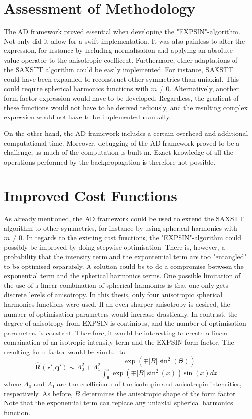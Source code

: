 \section{Assessment of Methodology}
\noindent
The AD framework proved essential when developing the "EXPSIN"-algorithm. Not only did it allow for a swift implementation.
It was also painless to alter the expression, for instance by including normalisation and applying an absolute value operator to the anisotropic coefficent.
Furthermore, other adaptations of the SAXSTT algorithm could be easily implemented. For instance, SAXSTT could have been expanded to reconstruct other symmetries than uniaxial.
This could require spherical harmonics functions with $m \neq 0$. Alternatively, another form factor expression would have to be developed.
Regardless, the gradient of these functions would not have to be derived tediously, and the resulting complex expression would not have to be implemented manually.

On the other hand, the AD framework includes a certain overhead and additional computational time. Moreover, debugging of the AD framework proved to be a challenge, as much of the computation is built-in.
Exact knowledge of all the operations performed by the backpropagation is therefore not possible.


\section{Improved Cost Functions}
As already mentioned, the AD framework could be used to extend the SAXSTT algorithm to other symmetries, for instance by using spherical harmonics with $m \neq 0$.
In regards to the existing cost functions, the "EXPSIN"-algorithm could possibly be improved by doing stepwise optimisation.
There is, however, a probability that the intensity term and the expontential term are too "entangled" to be optimised separately.
A solution could be to do a compromise between the exponential term and the spherical harmonics terms.
One possible limitation of the use of a linear combination of spherical harmonics is that one only gets discrete levels of anisotropy.
In this thesis, only four anisotropic spherical harmonics functions were used. If an even sharper anisotropy is desired, the number of optimisation parameters would increase drastically.
In contrast, the degree of anisotropy from EXPSIN is continious, and the number of optimisation parameters is constant.
Therefore, it would be interesting to create a linear combination of an isotropic intensity term and the EXPSIN form factor.
The resulting form factor would be similar to:
\begin{equation}
    \label{eq:form_factor_linear_combination}
    \bm{\widehat{R}}(\bm{r'}, \bm{q'}) \sim A_{0}^{2} + A_{1}^{2} \frac{\exp\left(\mp |B| \sin^2(\Theta) \right)} {\int_{0}^{\pi} \exp\left( \mp |B| \sin^{2}(x) \right) \sin(x) dx}
\end{equation}
\noindent
where $A_{0}$ and $A_{1}$ are the coefficients of the isotropic and anisotropic intensities, respectively. As before, $B$ determines the anisotropic shape of the form factor.
Note that the exponential term can replace any uniaxial spherical harmonics function.